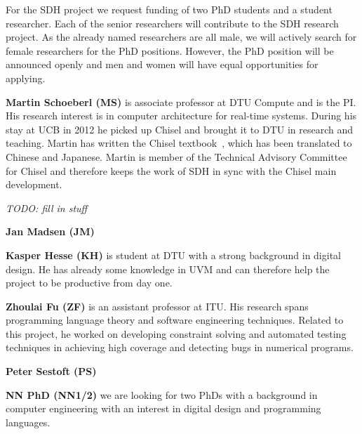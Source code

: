 \documentclass[fleqn,12pt]{article}
\newcommand{\todo}[1]{{\it TODO: #1}}
\begin{document}
For the SDH project we request funding of two PhD students and a student researcher.
Each of the senior researchers will contribute to the SDH research project.
%
%
As the already named researchers are all male, we will actively search
for female researchers for the PhD positions.
However, the PhD position will be announced openly and men and women
will have equal opportunities for applying.


{\bf Martin Schoeberl (MS)} is associate professor at DTU Compute and is the PI.
His research interest is in computer architecture for real-time systems. During his stay
at UCB in 2012 he picked up Chisel and brought it to DTU in research and teaching.
Martin has written the Chisel textbook~\cite{chisel:book}, which has been translated
to Chinese and Japanese. Martin is member of the Technical Advisory Committee for
Chisel and therefore keeps the work of SDH in sync with the Chisel main development.

\todo{fill in stuff}

{\bf Jan Madsen (JM)} 

{\bf Kasper Hesse (KH)} is student at DTU with a strong background in digital design.
He has already some knowledge in UVM and can therefore help the project to be productive
from day one.

{\bf Zhoulai Fu (ZF)} is an assistant professor at ITU. His research
spans programming language theory and software engineering
techniques. Related to this project, he worked on developing
constraint solving and automated testing techniques in achieving high
coverage and detecting bugs in numerical programs.

{\bf Peter Sestoft (PS)} 

{\bf NN PhD (NN1/2)} we are looking for two PhDs with a background in computer engineering
with an interest in digital design and programming languages.

%
\end{document}
